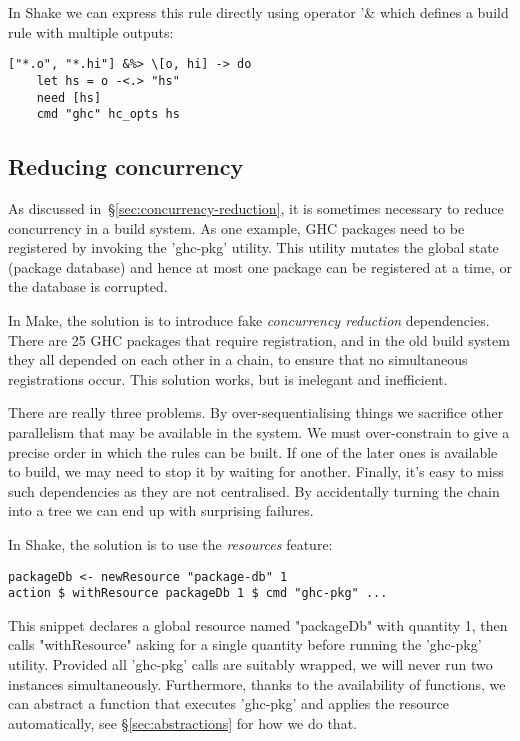 In Shake we can express this rule directly using operator \lst'&%
which defines a build rule with multiple outputs:


\begin{lstlisting}
["*.o", "*.hi"] &%> \[o, hi] -> do
    let hs = o -<.> "hs"
    need [hs]
    cmd "ghc" hc_opts hs
\end{lstlisting}

\subsection{Reducing concurrency\label{sec:ghc-pkg-db}}

As discussed in~\S\ref{sec:concurrency-reduction}, it is sometimes necessary to
reduce concurrency in a build system. As one example, GHC packages need to
be registered by invoking the \lst'ghc-pkg' utility. This utility mutates the
global state (package database) and hence at most one package can be registered
at a time, or the database is corrupted.

In Make, the solution is to introduce fake \emph{concurrency
reduction} dependencies. There are 25 GHC packages that require registration,
and in the old build system they all depended on each other in a chain, to
ensure that no simultaneous registrations occur. This solution works, but is
inelegant and inefficient.

There are really three problems. By over-sequentialising things we sacrifice
other parallelism that may be available in the system. We must over-constrain to
give a precise order in which the rules can be built. If one of the later ones
is available to build, we may need to stop it by waiting for another. Finally,
it's easy to miss such dependencies as they are not centralised. By accidentally
turning the chain into a tree we can end up with surprising failures.

In Shake, the solution is to use the \emph{resources} feature:

\begin{lstlisting}
packageDb <- newResource "package-db" 1
action $ withResource packageDb 1 $ cmd "ghc-pkg" ...
\end{lstlisting}

This snippet declares a global resource named \lst"packageDb" with quantity 1,
then calls \lst"withResource" asking for a single quantity before running the
\lst'ghc-pkg' utility. Provided all \lst'ghc-pkg' calls are suitably wrapped,
we will never run two instances simultaneously. Furthermore, thanks to the
availability of functions, we can abstract a function that executes
\lst'ghc-pkg' and applies the resource automatically, see
\S\ref{sec:abstractions} for how we do that.

